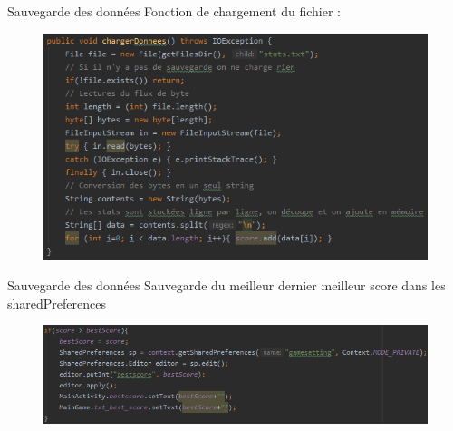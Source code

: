 \documentclass{beamer}
\begin{document}
\begin{frame}{Sauvegarde des données}
    Fonction de chargement du fichier :
    \begin{figure}
        \centering
        \includegraphics[scale=0.6]{LoadData.png}
    \end{figure}
\end{frame}
\begin{frame}{Sauvegarde des données}
Sauvegarde du meilleur dernier meilleur score dans les sharedPreferences
\begin{figure}
    \centering
    \includegraphics[scale=0.6]{SharedPreferences.png}
\end{figure}
\end{frame}
%
%
\end{document}

